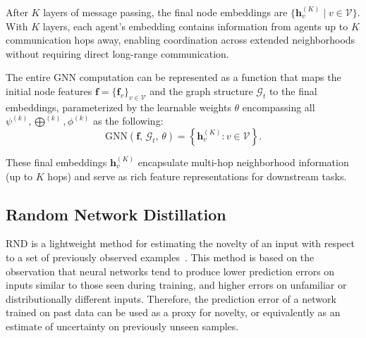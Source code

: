 After \(K\) layers of message passing, 
 the final node embeddings are \(\{\mathbf{h}_v^{(K)} \mid v \in \mathcal{V}\}\). 
%
With \(K\) layers, each agent's embedding contains information from agents up to \(K\) communication hops away, 
 enabling coordination across extended neighborhoods without requiring direct long-range communication.
 
The entire \gls{GNN} computation can be represented as a function that maps the initial node features 
 \(\mathbf{f} = \{\mathbf{f}_v\}_{v \in \mathcal{V}}\) 
 and the graph structure \(\mathcal{G}_t\) to the final embeddings,
 parameterized by the learnable weights 
 \(\theta\) encompassing all \(\psi^{(k)}, \bigoplus^{(k)}, \phi^{(k)}\) as the following:
\begin{equation}
\mathrm{GNN}(\mathbf{f},\, \mathcal{G}_t,\, \theta) = \left\{ \mathbf{h}_v^{(K)} : v \in \mathcal{V} \right\}.
\end{equation}

These final embeddings \(\mathbf{h}_v^{(K)}\) 
 encapsulate multi-hop neighborhood information (up to \(K\) hops) 
 and serve as rich feature representations for downstream tasks.

\subsection{Random Network Distillation}
\label{subsec:random-network-distillation}

\gls{RND} is a lightweight method for estimating the novelty of an input 
 with respect to a set of previously observed examples~\cite{DBLP:conf/iclr/BurdaESK19}. 
%
This method is based on the observation that neural networks tend to produce 
 lower prediction errors on inputs similar to those seen during training, 
 and higher errors on unfamiliar or distributionally different inputs. 
% 
Therefore, 
 the prediction error of a network trained on past data 
 can be used as a proxy for novelty, 
 or equivalently as an estimate of uncertainty on previously unseen samples.

